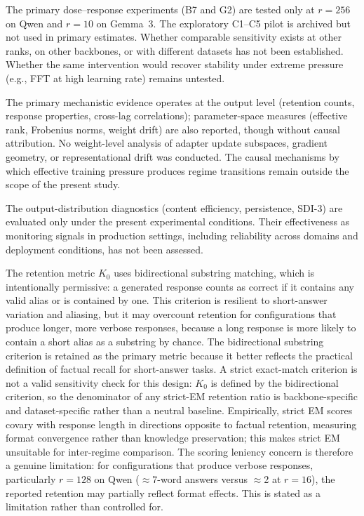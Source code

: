 \documentclass[a4paper,fleqn]{cas-dc}
\newif\ifshowchanges
\newcommand{\rev}[1]{\ifshowchanges{\color{blue}#1}\else{#1}\fi}
\begin{document}
\rev{The primary dose--response experiments (B7 and G2) are tested only at $r=256$ on Qwen and $r=10$ on Gemma~3. The exploratory C1--C5 pilot is archived but not used in primary estimates.}
\rev{Whether comparable sensitivity exists at other ranks, on other backbones, or with different datasets has not been established.} Whether the same
intervention would recover stability under extreme pressure (e.g., FFT at high
learning rate) remains untested.

\rev{The primary mechanistic evidence operates at the output level (retention counts, response
properties, cross-lag correlations); parameter-space measures (effective rank, Frobenius norms, weight drift) are also reported, though without causal attribution.} No weight-level analysis of adapter update
subspaces, gradient geometry, or representational drift was conducted. The causal
mechanisms by which effective training pressure produces regime transitions
remain outside the scope of the present study.

The output-distribution diagnostics (content efficiency, persistence, SDI-3) are
evaluated only under the present experimental conditions. Their effectiveness as
monitoring signals in production settings, including reliability across domains
and deployment conditions, has not been assessed.

\rev{The retention metric $K_0$ uses bidirectional substring matching, which
is intentionally permissive: a generated response counts as correct if it
contains any valid alias or is contained by one. This criterion is resilient to
short-answer variation and aliasing, but it may overcount retention for
configurations that produce longer, more verbose responses, because a long
response is more likely to contain a short alias as a substring by chance.
The bidirectional substring criterion is retained as the primary
metric because it better reflects the practical definition of factual recall
for short-answer tasks. A strict exact-match criterion is not a valid
sensitivity check for this design: $K_0$ is defined by the bidirectional
criterion, so the denominator of any strict-EM retention ratio is
backbone-specific and dataset-specific rather than a neutral baseline.
Empirically, strict EM scores covary with response length
in directions opposite to factual retention, measuring format convergence
rather than knowledge preservation; this makes strict EM unsuitable
for inter-regime comparison. The scoring leniency concern is therefore a
genuine limitation: for configurations that produce verbose responses,
particularly $r=128$ on Qwen ($\approx$7-word answers versus $\approx$2 at
$r=16$), the reported retention may partially reflect format effects.
This is stated as a limitation rather than
controlled for.}
\end{document}
